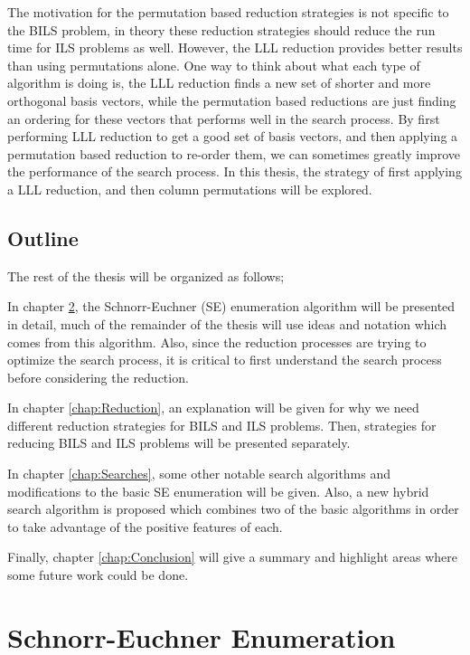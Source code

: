 \documentclass[12pt,Bold,letterpaper]{mcgilletdclass}
\begin{document}
The motivation for the permutation based reduction strategies is not specific to the BILS problem, in theory these reduction strategies should reduce the run time for ILS problems as well. However, the LLL reduction provides better results than using permutations alone. One way to think about what each type of algorithm is doing is, the LLL reduction finds a new set of shorter and more orthogonal basis vectors, while the permutation based reductions are just finding an ordering for these vectors that performs well in the search process. By first performing LLL reduction to get a good set of basis vectors, and then applying a permutation based reduction to re-order them, we can sometimes greatly improve the performance of the search process. In this thesis, the strategy of first applying a LLL reduction, and then column permutations will be explored.

\section{Outline}
The rest of the thesis will be organized as follows;

In chapter \ref{chap:SESearch}, the Schnorr-Euchner (SE) enumeration algorithm \cite{SchE94} will be presented in detail, much of the remainder of the thesis will use ideas and notation which comes from this algorithm. Also, since the reduction processes are trying to optimize the search process, it is critical to first understand the search process before considering the reduction.

In chapter \ref{chap:Reduction}, an explanation will be given for why we need different reduction strategies for BILS and ILS problems. Then, strategies for reducing BILS and ILS problems will be presented separately.

In chapter \ref{chap:Searches}, some other notable search algorithms and modifications to the basic SE enumeration will be given. Also, a new hybrid search algorithm is proposed which combines two of the basic algorithms in order to take advantage of the positive features of each.

Finally, chapter \ref{chap:Conclusion} will give a summary and highlight areas where some future work could be done.

\chapter{Schnorr-Euchner Enumeration} \label{chap:SESearch}
\end{document}
